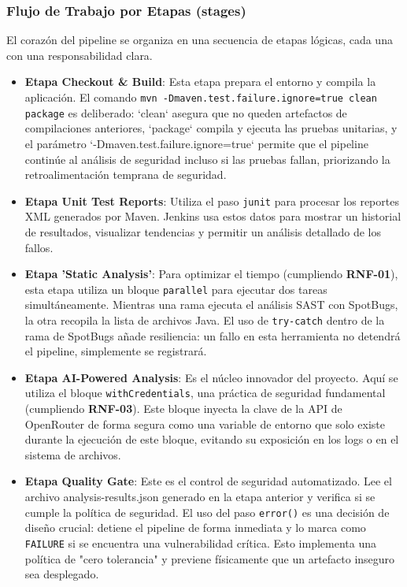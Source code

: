 \subsubsection{Flujo de Trabajo por Etapas (stages)}
El corazón del pipeline se organiza en una secuencia de etapas lógicas, cada una con una responsabilidad clara.

\begin{itemize}
    \item \textbf{Etapa Checkout \& Build}: Esta etapa prepara el entorno y compila la aplicación. El comando \texttt{mvn -Dmaven.test.failure.ignore=true clean package} es deliberado: `clean` asegura que no queden artefactos de compilaciones anteriores, `package` compila y ejecuta las pruebas unitarias, y el parámetro `-Dmaven.test.failure.ignore=true` permite que el pipeline continúe al análisis de seguridad incluso si las pruebas fallan, priorizando la retroalimentación temprana de seguridad.

    \item \textbf{Etapa Unit Test Reports}: Utiliza el paso \texttt{junit} para procesar los reportes XML generados por Maven. Jenkins usa estos datos para mostrar un historial de resultados, visualizar tendencias y permitir un análisis detallado de los fallos.

    \item \textbf{Etapa 'Static Analysis'}: Para optimizar el tiempo (cumpliendo \textbf{RNF-01}), esta etapa utiliza un bloque \texttt{parallel} para ejecutar dos tareas simultáneamente. Mientras una rama ejecuta el análisis SAST con SpotBugs, la otra recopila la lista de archivos Java. El uso de \texttt{try-catch} dentro de la rama de SpotBugs añade resiliencia: un fallo en esta herramienta no detendrá el pipeline, simplemente se registrará.

    \item \textbf{Etapa AI-Powered Analysis}: Es el núcleo innovador del proyecto. Aquí se utiliza el bloque \texttt{withCredentials}, una práctica de seguridad fundamental (cumpliendo \textbf{RNF-03}). Este bloque inyecta la clave de la API de OpenRouter de forma segura como una variable de entorno que solo existe durante la ejecución de este bloque, evitando su exposición en los logs o en el sistema de archivos.

    \item \textbf{Etapa Quality Gate}: Este es el control de seguridad automatizado. Lee el archivo analysis-results.json generado en la etapa anterior y verifica si se cumple la política de seguridad. El uso del paso \texttt{error()} es una decisión de diseño crucial: detiene el pipeline de forma inmediata y lo marca como \texttt{FAILURE} si se encuentra una vulnerabilidad crítica. Esto implementa una política de "cero tolerancia" y previene físicamente que un artefacto inseguro sea desplegado.


\end{itemize}
